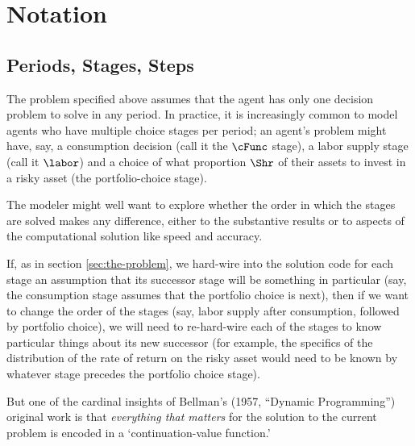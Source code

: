 \documentclass[\econtexRoot/SolvingMicroDSOPs]{subfiles}
\begin{document}
\hypertarget{notation}{}
\section{Notation}\label{sec:notation}

\subsection{Periods, Stages, Steps}

The problem specified above assumes that the agent has only one decision problem to solve in any {period}.  In practice, it is increasingly common to model agents who have multiple choice {stage}s per {period}; an agent's problem might have, say, a consumption decision (call it the $\cFunc$ {stage}), a labor supply {stage} (call it $\labor$) and a choice of what proportion $\Shr$ of their assets to invest in a risky asset (the portfolio-choice {stage}).

The modeler might well want to explore whether the order in which the {stage}s are solved makes any difference, either to the substantive results or to aspects of the computational solution like speed and accuracy.

If, as in section \ref{sec:the-problem}, we hard-wire into the solution code for each {stage} an assumption that its successor {stage} will be something in particular (say, the consumption {stage} assumes that the portfolio choice is next), then if we want to change the order of the {stage}s (say, labor supply after consumption, followed by portfolio choice), we will need to re-hard-wire each of the stages to know particular things about its new successor (for example, the specifics of the distribution of the rate of return on the risky asset would need to be known by whatever {stage} precedes the portfolio choice {stage}).

But one of the cardinal insights of Bellman's (1957, ``Dynamic Programming'') original work is that \emph{everything that matters} for the solution to the current problem is encoded in a `continuation-value function.' %
\end{document}

